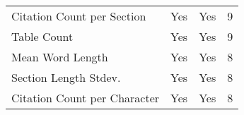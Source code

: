 \begin{table}[htbp]
\begin{tabular}{m{} c c c}
        Citation Count per Section & Yes & Yes & 9 \\
        Table Count & Yes & Yes & 9 \\
        Mean Word Length & Yes & Yes & 8 \\
        Section Length Stdev. & Yes & Yes & 8 \\
        Citation Count per Character & Yes & Yes & 8 \\
        \bottomrule
    \end{tabular}
\end{table}